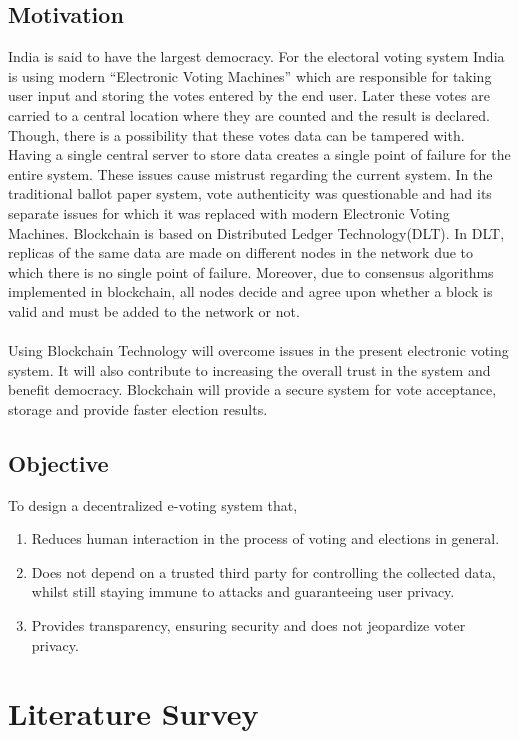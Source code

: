 \documentclass[oneside, 12pt]{book}
\begin{document}
\subsection{Motivation}
India is said to have the largest democracy. For the electoral voting system India is using modern “Electronic Voting Machines” which are responsible for taking user input and storing the votes entered by the end user. Later these votes are carried to a central location where they are counted and the result is declared. Though, there is a possibility that these votes data can be tampered with. Having a single central server to store data creates a single point of failure for the entire system. These issues cause mistrust regarding the current system. In the traditional ballot paper system, vote authenticity was questionable and had its separate issues for which it was replaced with modern Electronic Voting Machines. Blockchain is based on Distributed Ledger Technology(DLT). In DLT, replicas of the same data are made on different nodes in the network due to which there is no single point of failure. Moreover, due to consensus algorithms implemented in blockchain, all nodes decide and agree upon whether a block is valid and must be added to the network or not.
\\\\Using Blockchain Technology will overcome issues in the present electronic voting system. It will also contribute to increasing the overall trust in the system and benefit democracy. Blockchain will provide a secure system for vote acceptance, storage and provide faster election results.
\subsection{Objective}
To design a decentralized e-voting system that,
\begin{enumerate}
	\item Reduces human interaction in the process of voting and elections in general.
	\item Does not depend on a trusted third party for controlling the collected data, whilst still staying immune to attacks and guaranteeing user privacy.
	\item Provides transparency, ensuring security and does not jeopardize voter privacy.
\end{enumerate}
\newpage
\section{Literature Survey}
\newpage
\end{document}
